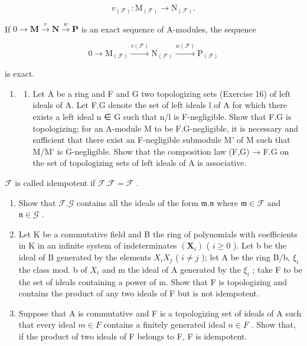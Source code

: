 \[
v _ {(\mathcal {F})} \colon \mathrm{M} _ {(\mathcal {F})} \rightarrow \mathrm{N} _ {(\mathcal {F})}.
\]

If \(0 \to \mathbf{M} \xrightarrow{v} \mathbf{N} \xrightarrow{w} \mathbf{P}\) is an exact sequence of A-modules, the sequence

\[
0 \longrightarrow \mathrm{M} _ {(\mathcal {F})} \stackrel {v (\mathcal {F})} {\longrightarrow} \mathrm{N} _ {(\mathcal {F})} \stackrel {w (\mathcal {F})} {\longrightarrow} \mathrm{P} _ {(\mathcal {F})}
\]

is exact.

\begin{enumerate}
\def\labelenumi{\arabic{enumi}.}
\setcounter{enumi}{17}
\tightlist
\item
  \begin{enumerate}
  \def\labelenumii{(\alph{enumii})}
  \tightlist
  \item
    Let A be a ring and F and G two topologizing sets (Exercise 16) of left ideals of A. Let F.G denote the set of left ideals l of A for which there exists a left ideal n ∈ G such that n/l is F-negligible. Show that F.G is topologizing; for an A-module M to be F.G-negligible, it is necessary and sufficient that there exist an F-negligible submodule M' of M such that M/M' is G-negligible. Show that the composition law (F,G) → F.G on the set of topologizing sets of left ideals of A is associative.
  \end{enumerate}
\end{enumerate}

\(\mathcal{F}\) is called idempotent if \(\mathcal{F}.\mathcal{F} = \mathcal{F}\) .

\begin{enumerate}
\def\labelenumi{(\alph{enumi})}
\setcounter{enumi}{1}
\item
  Show that \(\mathcal{F}.\mathcal{G}\) contains all the ideals of the form \(\mathfrak{m}.\mathfrak{n}\) where \(\mathfrak{m}\in\mathcal{F}\) and \(\mathfrak{n}\in\mathcal{G}\) .
\item
  Let K be a commutative field and B the ring of polynomials with coefficients in K in an infinite system of indeterminates \((\mathbf{X}_{i})\) ( \(i \geqslant 0\) ). Let b be the ideal of B generated by the elements \(X_{i}X_{j}\) ( \(i \neq j\) ); let A be the ring B/b, \(\xi_{i}\) the class mod. b of \(X_{i}\) and m the ideal of A generated by the \(\xi_{i}\) ; take F to be the set of ideals containing a power of m. Show that F is topologizing and contains the product of any two ideals of F but is not idempotent.
\item
  Suppose that A is commutative and F is a topologizing set of ideals of A such that every ideal \(m \in F\) contains a finitely generated ideal \(n \in F\) . Show that, if the product of two ideals of F belongs to F, F is idempotent.
\end{enumerate}

